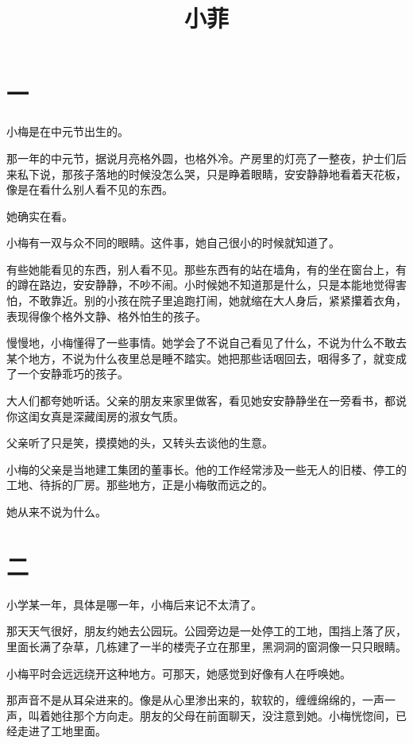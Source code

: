 \documentclass[12pt,a4paper]{ctexart}
\title{\Huge 小菲}
\author{}
\date{}
\begin{document}
\maketitle

\section*{一}

小梅是在中元节出生的。

那一年的中元节，据说月亮格外圆，也格外冷。产房里的灯亮了一整夜，护士们后来私下说，那孩子落地的时候没怎么哭，只是睁着眼睛，安安静静地看着天花板，像是在看什么别人看不见的东西。

她确实在看。

小梅有一双与众不同的眼睛。这件事，她自己很小的时候就知道了。

有些她能看见的东西，别人看不见。那些东西有的站在墙角，有的坐在窗台上，有的蹲在路边，安安静静，不吵不闹。小时候她不知道那是什么，只是本能地觉得害怕，不敢靠近。别的小孩在院子里追跑打闹，她就缩在大人身后，紧紧攥着衣角，表现得像个格外文静、格外怕生的孩子。

慢慢地，小梅懂得了一些事情。她学会了不说自己看见了什么，不说为什么不敢去某个地方，不说为什么夜里总是睡不踏实。她把那些话咽回去，咽得多了，就变成了一个安静乖巧的孩子。

大人们都夸她听话。父亲的朋友来家里做客，看见她安安静静坐在一旁看书，都说你这闺女真是深藏闺房的淑女气质。

父亲听了只是笑，摸摸她的头，又转头去谈他的生意。

小梅的父亲是当地建工集团的董事长。他的工作经常涉及一些无人的旧楼、停工的工地、待拆的厂房。那些地方，正是小梅敬而远之的。

她从来不说为什么。

\section*{二}

小学某一年，具体是哪一年，小梅后来记不太清了。

那天天气很好，朋友约她去公园玩。公园旁边是一处停工的工地，围挡上落了灰，里面长满了杂草，几栋建了一半的楼壳子立在那里，黑洞洞的窗洞像一只只眼睛。

小梅平时会远远绕开这种地方。可那天，她感觉到好像有人在呼唤她。

那声音不是从耳朵进来的。像是从心里渗出来的，软软的，缠缠绵绵的，一声一声，叫着她往那个方向走。朋友的父母在前面聊天，没注意到她。小梅恍惚间，已经走进了工地里面。
\end{document}
